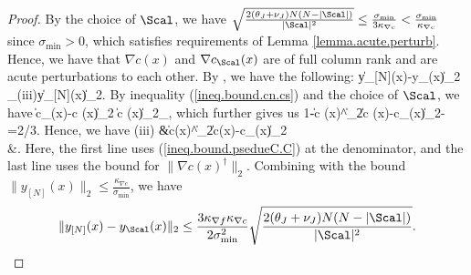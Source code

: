 \begin{proof}

	
By the choice of $\Scal$, we have $\sqrt{ \frac{2(\theta_J+\nu_J)N(N-|\Scal|)}{|\Scal|^2}}\le \frac{\sigma_{\min}}{3\kappa_{\nabla c}}<\frac{\sigma_{\min}}{\kappa_{\nabla c}}$ since $\sigma_{\min}>0$, which satisfies requirements of Lemma \ref{lemma.acute.perturb}. Hence, we have that $\nabla c (x)$ and $\nabla c_\Scal(x)$ are of full column rank and are acute perturbations to each other. By \cite[Theorem 5.2]{396bf6e1-ef54-3bf6-a49b-862db8404076}, we have the following:
\bequation
\label{ineq.define.iii}
	\|y_{[N]}(x)-y_\Scal(x)\|_2
	\le {}_{(iii)}\|y_{[N]}(x)\|_2.
\eequation
	By inequality (\ref{ineq.bound.cn.cs}) and the choice of $\Scal$, we have
	\bequationNN
	\|\nabla c_\Scal(x)-\nabla c (x)\|_2
	\le{}\|\nabla c (x)\|_2\le {}\sigma_{\min},
\eequationNN
which further gives us
	\bequation
	\label{ineq.bound.psedueC.C}
		1-\|\nabla c (x)^\dag\|_2\|\nabla c (x)-\nabla c_\Scal(x)\|_2-=2/3.
	\eequation
	Hence, we have
	\bequation
	\label{ineq.bound.psi}
	\baligned
	(iii)
	&\le {}\|\nabla c(x)^\dag\|_2\|\nabla c(x)-\nabla c_\Scal(x)\|_2\\
	&\le {}.
\ealigned
\eequation
Here, the first line uses (\ref{ineq.bound.psedueC.C}) at the denominator, and the last line uses the bound for $\|\nabla c(x)^\dag\|_2$. Combining with the bound $\|y_{[N]}(x)\|_2\le\frac{\kappa_{\nabla c}}{\sigma_{\min}}$, we have
	\[
	\|y_{[N]}(x)-y_\Scal(x)\|_2
	 \le \frac{3\kappa_{\nabla f}\kappa_{\nabla c}}{2 \sigma_{\min}^2}\sqrt{ \frac{2(\theta_J+\nu_J)N(N-|\Scal|)}{|\Scal|^2}}.
	\]
	

\end{proof}
